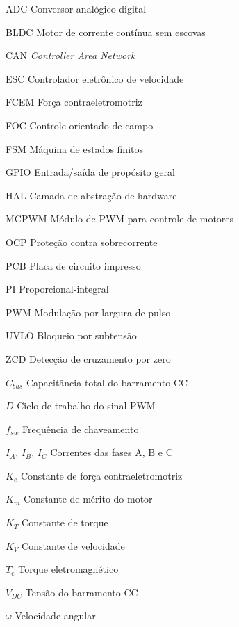 \documentclass[12pt, a4paper, openright, oneside, chapter=TITLE, brazilian]{abntex2}
\begin{document}
\listoftables*
\cleardoublepage

\begin{siglas}
    \item[ADC] Conversor analógico-digital
    \item[BLDC] Motor de corrente contínua sem escovas
    \item[CAN] \textit{Controller Area Network}
    \item[ESC] Controlador eletrônico de velocidade
    \item[FCEM] Força contraeletromotriz
    \item[FOC] Controle orientado de campo
    \item[FSM] Máquina de estados finitos
    \item[GPIO] Entrada/saída de propósito geral
    \item[HAL] Camada de abstração de hardware
    \item[MCPWM] Módulo de PWM para controle de motores
    \item[OCP] Proteção contra sobrecorrente
    \item[PCB] Placa de circuito impresso
    \item[PI] Proporcional-integral
    \item[PWM] Modulação por largura de pulso
    \item[UVLO] Bloqueio por subtensão
    \item[ZCD] Detecção de cruzamento por zero
\end{siglas}
\cleardoublepage

\begin{simbolos}
    \item[$C_{bus}$] Capacitância total do barramento CC
    \item[$D$] Ciclo de trabalho do sinal PWM
    \item[$f_{sw}$] Frequência de chaveamento
    \item[$I_A$, $I_B$, $I_C$] Correntes das fases A, B e C
    \item[$K_e$] Constante de força contraeletromotriz
    \item[$K_m$] Constante de mérito do motor
    \item[$K_T$] Constante de torque
    \item[$K_V$] Constante de velocidade
    \item[$T_e$] Torque eletromagnético
    \item[$V_{DC}$] Tensão do barramento CC
    \item[$\omega$] Velocidade angular
\end{simbolos}
\cleardoublepage

\tableofcontents*
\cleardoublepage

\hypersetup{pageanchor=true}
\textual






\postextual
\printbibliography
\end{document}
